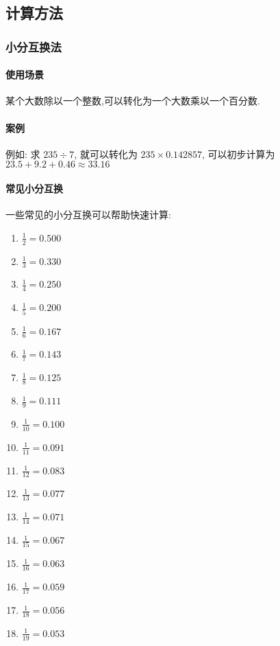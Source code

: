 \subsection{计算方法}

\subsubsection{小分互换法}

\paragraph{使用场景} 某个大数除以一个整数,可以转化为一个大数乘以一个百分数.

\paragraph{案例} 例如: 求 $235 \div 7$, 就可以转化为 $235 \times 0.142857$, 可以初步计算为$23.5 + 9.2 + 0.46 \approx 33.16$

\paragraph{常见小分互换} 一些常见的小分互换可以帮助快速计算:

\begin{multicols}{2}
	\begin{enumerate}
		\item $\frac{1}{2} = 0.500$
		\item $\frac{1}{3} = 0.330$
		\item $\frac{1}{4} = 0.250$
		\item $\frac{1}{5} = 0.200$
		\item $\frac{1}{6} = 0.167$
		\item $\frac{1}{7} = 0.143$
		\item $\frac{1}{8} = 0.125$
		\item $\frac{1}{9} = 0.111$
		\item $\frac{1}{10} = 0.100$
		\item $\frac{1}{11} = 0.091$
		\item $\frac{1}{12} = 0.083$
		\item $\frac{1}{13} = 0.077$
		\item $\frac{1}{14} = 0.071$
		\item $\frac{1}{15} = 0.067$
		\item $\frac{1}{16} = 0.063$
		\item $\frac{1}{17} = 0.059$
		\item $\frac{1}{18} = 0.056$
		\item $\frac{1}{19} = 0.053$
	\end{enumerate}
\end{multicols}

